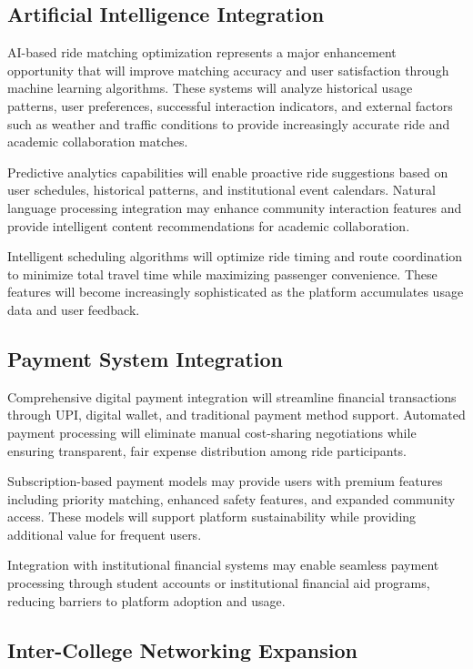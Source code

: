 \documentclass[conference]{IEEEtran}
\begin{document}
\subsection{Artificial Intelligence Integration}

AI-based ride matching optimization represents a major enhancement opportunity that will improve matching accuracy and user satisfaction through machine learning algorithms. These systems will analyze historical usage patterns, user preferences, successful interaction indicators, and external factors such as weather and traffic conditions to provide increasingly accurate ride and academic collaboration matches.

Predictive analytics capabilities will enable proactive ride suggestions based on user schedules, historical patterns, and institutional event calendars. Natural language processing integration may enhance community interaction features and provide intelligent content recommendations for academic collaboration.

Intelligent scheduling algorithms will optimize ride timing and route coordination to minimize total travel time while maximizing passenger convenience. These features will become increasingly sophisticated as the platform accumulates usage data and user feedback.

\subsection{Payment System Integration}

Comprehensive digital payment integration will streamline financial transactions through UPI, digital wallet, and traditional payment method support. Automated payment processing will eliminate manual cost-sharing negotiations while ensuring transparent, fair expense distribution among ride participants.

Subscription-based payment models may provide users with premium features including priority matching, enhanced safety features, and expanded community access. These models will support platform sustainability while providing additional value for frequent users.

Integration with institutional financial systems may enable seamless payment processing through student accounts or institutional financial aid programs, reducing barriers to platform adoption and usage.

\subsection{Inter-College Networking Expansion}
\end{document}

